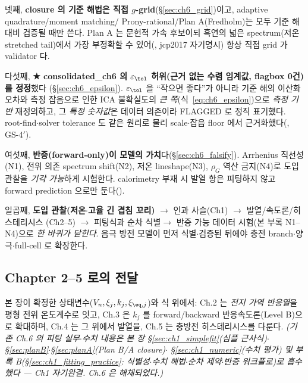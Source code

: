 넷째, \textbf{closure 의 기준 해법은 직접 $g$-grid}(\S\ref{sec:ch6_grid})이고, adaptive quadrature/moment matching/
Prony-rational/Plan A(Fredholm)는 모두 기준 해 대비 검증될 때만 쓴다. Plan A 는 문헌적 가속 후보이되 흑연의 넓은
spectrum(저온 stretched tail)에서 가장 부정확할 수 있어(, jcp2017 자기명시) 항상 직접 grid 가 validator 다.

다섯째, \textbf{★ consolidated\_ch6 의 $\varepsilon_\tol$ 허위(근거 없는 수렴 임계값, flagbox 0건)를 정정}했다
(\S\ref{sec:ch6_epsilon}). $\varepsilon_\tol$ 을 ``작으면 좋다''가 아니라 기준 해의 이산화 오차와 측정 잡음으로
인한 ICA 불확실도의 \emph{큰 쪽}(식~\eqref{eq:ch6_epsilon})으로 \emph{측정 기반} 재정의하고, 그 \emph{특정 숫자값}은
데이터 의존이라 FLAGGED 로 정직 표기했다. root-find$\cdot$solver tolerance 도 같은 원리로 물리 scale$\cdot$잡음
floor 에서 근거화했다(, GS-4$'$).

여섯째, \textbf{반증(forward-only)이 모델의 가치}다(\S\ref{sec:ch6_falsify}). Arrhenius 직선성(N1), 전위 의존
spectrum shift(N2), 저온 lineshape(N3), $\rho_G$ 역산 금지(N4)로 도입 관찰을 \emph{기각 가능}하게 시험한다.
calorimetry 부재 시 발열 항은 피팅하지 않고 forward prediction 으로만 둔다().

일곱째, \textbf{도입 관찰(저온$\cdot$고율 긴 겹침 꼬리)} $\to$ 인과 사슬(Ch1) $\to$ 발열/속도론/히스테리시스
(Ch2--5) $\to$ 피팅식과 순차 식별$\to$ 반증 가능 데이터 시험(본 부록 N1--N4)으로 \emph{한 바퀴가 닫힌다}. 음극
방전 모델이 먼저 식별$\cdot$검증된 뒤에야 충전 branch$\cdot$양극$\cdot$full-cell 로 확장한다.

\subsection*{Chapter 2--5 로의 전달}
본 장이 확정한 상태변수($V_n,\xi_j,k_j,\xi_{\eq,j}$)와 식 위에서: Ch.2 는 \emph{전지 가역 반응열}을 평형
전위 온도계수로 잇고, Ch.3 은 $k_j$ 를 forward/backward 반응속도론(Level B)으로 확대하며, Ch.4 는 그 위에서
발열을, Ch.5 는 충방전 히스테리시스를 다룬다. \emph{(기존 Ch.6 의 피팅 실무$\cdot$수치 내용은 본 장
\S\ref{sec:ch1_simplefit}(심플 근사식)$\cdot$\S\ref{sec:planB}$\cdot$\S\ref{sec:planA}(Plan B/A closure)$\cdot$
\S\ref{sec:ch1_numeric}(수치 평가) 및 \emph{부록 B}(\S\ref{sec:ch1_fitting_practice}: 식별성$\cdot$수치 해법$\cdot$순차 제약$\cdot$반증 워크플로)로 흡수했다 — Ch1 자기완결. Ch.6 은 해체되었다.)}



\clearpage
